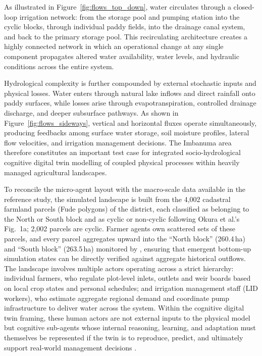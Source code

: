 \documentclass{article}
\begin{document}
As illustrated in Figure~\ref{fig:flows_top_down}, water circulates through a closed-loop irrigation network: from the storage pool and pumping station into the cyclic blocks, through individual paddy fields, into the drainage canal system, and back to the primary storage pool. This recirculating architecture creates a highly connected network in which an operational change at any single component propagates altered water availability, water levels, and hydraulic conditions across the entire system.

Hydrological complexity is further compounded by external stochastic inputs and physical losses. Water enters through natural lake inflows and direct rainfall onto paddy surfaces, while losses arise through evapotranspiration, controlled drainage discharge, and deeper subsurface pathways. As shown in Figure~\ref{fig:flows_sideways}, vertical and horizontal fluxes operate simultaneously, producing feedbacks among surface water storage, soil moisture profiles, lateral flow velocities, and irrigation management decisions. The Imbanuma area therefore constitutes an important test case for integrated socio-hydrological cognitive digital twin modelling of coupled physical processes within heavily managed agricultural landscapes.

\begin{changed}
To reconcile the micro-agent layout with the macro-scale data available in the reference study, the simulated landscape is built from the 4,002 cadastral farmland parcels (Fude polygons) of the district, each classified as belonging to the North or South block and as cyclic or non-cyclic following Okura et al.'s Fig.~1a; 2,002 parcels are cyclic. Farmer agents own scattered sets of these parcels, and every parcel aggregates upward into the ``North block'' (260.4\,ha) and ``South block'' (263.5\,ha) monitored by \cite{Okura2025WaterBalance}, ensuring that emergent bottom-up simulation states can be directly verified against aggregate historical outflows. The landscape involves multiple actors operating across a strict hierarchy: individual farmers, who regulate plot-level inlets, outlets and weir boards based on local crop states and personal schedules; and irrigation management staff (LID workers), who estimate aggregate regional demand and coordinate pump infrastructure to deliver water across the system. Within the cognitive digital twin framing, these human actors are not external inputs to the physical model but cognitive sub-agents whose internal reasoning, learning, and adaptation must themselves be represented if the twin is to reproduce, predict, and ultimately support real-world management decisions \cite{Tao2021DigitalTwin, Verdouw2021AgricultureDT}.
\end{changed}
\end{document}
